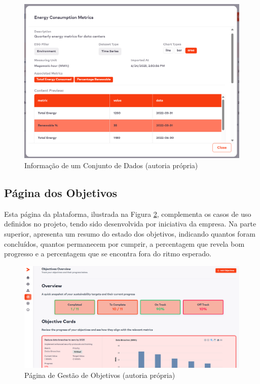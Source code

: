 \begin{figure}[H]
    \centering
    \includegraphics[width=5in,keepaspectratio]{frontmatter/assets/platform_prints/dataset/dataset_info.png}
    \caption{Informação de um Conjunto de Dados (autoria própria)}
    \label{fig:dataset_info}
\end{figure}

\subsection{Página dos Objetivos}

Esta página da plataforma, ilustrada na Figura \ref{fig:objectives_done}, complementa os casos de uso definidos no projeto, tendo sido desenvolvida por iniciativa da empresa. Na parte superior, apresenta um resumo do estado dos objetivos, indicando quantos foram concluídos, quantos permanecem por cumprir, a percentagem que revela bom progresso e a percentagem que se encontra fora do ritmo esperado.

\begin{figure}[H]
    \centering
    \includegraphics[width=\linewidth,keepaspectratio]{frontmatter/assets/platform_prints/objetives/objective_done.png}
    \caption{Página de Gestão de Objetivos (autoria própria)}
    \label{fig:objectives_done}
\end{figure}

